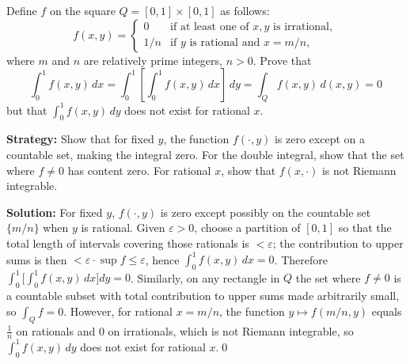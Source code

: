 \begin{problembox}
Define \( f \) on the square \( Q = [0, 1] \times [0, 1] \) as follows:
\[f(x, y) = 
\begin{cases} 
0 & \text{if at least one of } x, y \text{ is irrational}, \\ 
1/n & \text{if } y \text{ is rational and } x = m/n,
\end{cases}\]
where \( m \) and \( n \) are relatively prime integers, \( n > 0 \). Prove that
\[\int_{0}^{1} f(x, y) \, dx = \int_{0}^{1} \left[ \int_{0}^{1} f(x, y) \, dx \right] \, dy = \int_{Q} f(x, y) \, d(x, y) = 0\]
but that \( \int_{0}^{1} f(x, y) \, dy \) does not exist for rational \( x \).
\end{problembox}

\noindent\textbf{Strategy:} Show that for fixed $y$, the function $f(\cdot,y)$ is zero except on a countable set, making the integral zero. For the double integral, show that the set where $f\neq 0$ has content zero. For rational $x$, show that $f(x,\cdot)$ is not Riemann integrable.

\bigskip\noindent\textbf{Solution:}
For fixed $y$, $f(\cdot,y)$ is zero except possibly on the countable set $\{m/n\}$ when $y$ is rational. Given $\varepsilon>0$, choose a partition of $[0,1]$ so that the total length of intervals covering those rationals is $<\varepsilon$; the contribution to upper sums is then $<\varepsilon\cdot\sup f\le \varepsilon$, hence $\int_0^1 f(x,y)\,dx=0$. Therefore $\int_0^1\!\Big[\int_0^1 f(x,y)\,dx\Big]dy=0$.
Similarly, on any rectangle in $Q$ the set where $f\ne 0$ is a countable subset with total contribution to upper sums made arbitrarily small, so $\int_Q f=0$. However, for rational $x=m/n$, the function $y\mapsto f(m/n,y)$ equals $\tfrac{1}{n}$ on rationals and $0$ on irrationals, which is not Riemann integrable, so $\int_0^1 f(x,y)\,dy$ does not exist for rational $x$.\qed


